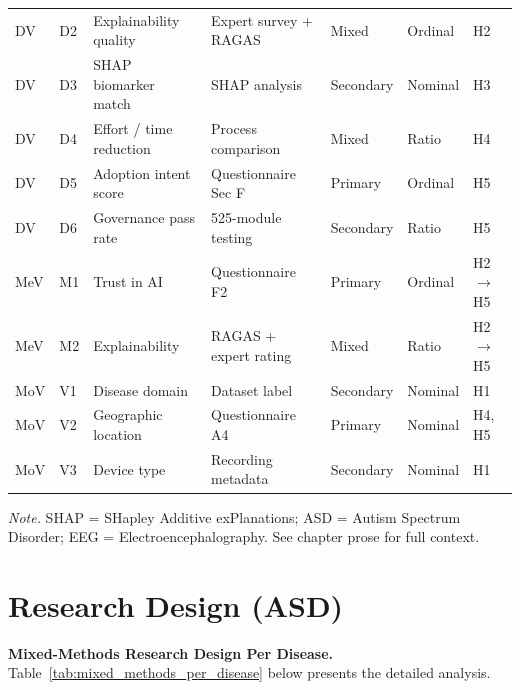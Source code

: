 {\begin{xltabular}{\textwidth}{@{} P{0.7cm} P{0.5cm} P{2.5cm} L P{1.3cm} P{1.1cm} P{1.4cm} @{}}
\addlinespace
DV & D2 & Explainability quality & Expert survey + RAGAS & Mixed & Ordinal & H2 \\
\addlinespace
DV & D3 & SHAP biomarker match & SHAP analysis & Secondary & Nominal & H3 \\
\addlinespace
DV & D4 & Effort / time reduction & Process comparison & Mixed & Ratio & H4 \\
\addlinespace
DV & D5 & Adoption intent score & Questionnaire Sec F & Primary & Ordinal & H5 \\
\addlinespace
DV & D6 & Governance pass rate & 525-module testing & Secondary & Ratio & H5 \\
\midrule
MeV & M1 & Trust in AI & Questionnaire F2 & Primary & Ordinal & H2$\to$H5 \\
\addlinespace
MeV & M2 & Explainability & RAGAS + expert rating & Mixed & Ratio & H2$\to$H5 \\
\midrule
MoV & V1 & Disease domain & Dataset label & Secondary & Nominal & H1 \\
\addlinespace
MoV & V2 & Geographic location & Questionnaire A4 & Primary & Nominal & H4, H5 \\
\addlinespace
MoV & V3 & Device type & Recording metadata & Secondary & Nominal & H1 \\
\end{xltabular}}
\vspace{0.3em}\noindent\textit{Note.} SHAP = SHapley Additive exPlanations; ASD = Autism Spectrum Disorder; EEG = Electroencephalography. See chapter prose for full context.

\section*{Research Design (ASD)}

\noindent\textbf{Mixed-Methods Research Design Per Disease.} Table~\ref{tab:mixed_methods_per_disease} below presents the detailed analysis.

